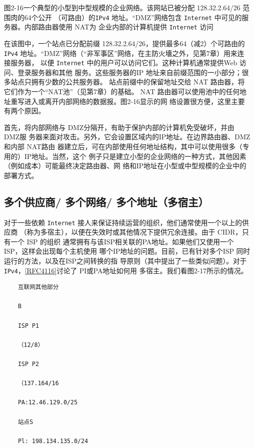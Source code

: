 图2-16一个典型的小型到中型规模的企业网络。该网站已被分配 128.32.2.64/26 范围肉的64个公开
（可路由）的\verb|IPv4| 地址。“DMZ”网络包含 \verb|Internet| 中可见的服务器。内部路由器使用 NAT为
企业内部的计算机提供 \verb|Internet| 访问

在该图中，一个站点已分配前缀 128.32.2.64/26，提供最多64（减2）个可路由的\verb|IPv4|
地址。“DMZ”网络（“非军事区”网络，在主防火墻之外，见第7章）用来连接服务器，
以便 \verb|Internet| 中的用户可以访问它们。这种计算机通常提供Web 访问、登录服务器和其他
服务。这些服务器的IP 地址来自前缀范围的一小部分；很多站点只拥有少数的公共服务器。
站点前缀中的保留地址交给 NAT 路由器，将它们作为一个“NAT池”（见第7章）的基础。
NAT 路由器可以使用池中的任何地址重写进入或离开内部网络的数据报。图2-16显示的网
络设置很方便，这里主要有两个原因。

首先，将内部网络与 DMZ分隔开，有助于保护内部的计算机免受破坏，并由 DMZ服
务器来面对攻击。另外，它会设置区域内的IP地址。在边界路由器、DMZ和内部 NAT路由
器建立后，可在内部使用任何地址结构，其中可以使用很多（专用的）IP地址。当然，这个
例子只是建立小型的企业网络的一种方式，其他因素（例如成本）可能最终决定路由器、网
络和IP地址在小型或中型规模的企业中的部署方式。

\subsection{多个供应商/ 多个网络/ 多个地址（多宿主）}
对于一些依赖 \verb|Internet| 接人来保证持续运营的组织，他们通常使用一个以上的供应商
（称为多宿主），以便在失效时或其他情况下提供冗余连接。由于 CIDR，只有一个 ISP 的组织
通常拥有与该ISP相关联的PA地址。如果他们又使用一个ISP，这样会出现每个主机使用
哪个IP地址的问题。目前，已有针对多个ISP 同时运行的方法，以及在ISP之间转换的指
导原则（其中提出了一些类似问题）。对于 \verb|IPv4|，\href{https://www.rfc-editor.org/rfc/rfc4116}{[RFC4116]}讨论了 PI或PA地址如何用
多宿主。我们看图2-17所示的情况。

\begin{verbatim}
    互联网其他部分
    
    B
    
    ISP P1
    
    （12/8）
    
    ISP P2
    
    （137.164/16
    
    PA:12.46.129.0/25
    
    站点S
    
    Pl: 198.134.135.0/24
\end{verbatim}

